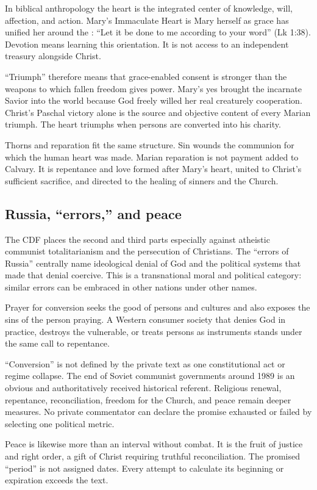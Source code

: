 In biblical anthropology the heart is the integrated center of knowledge, will, affection, and action. Mary's Immaculate Heart is Mary herself as grace has unified her around the : “Let it be done to me according to your word” (Lk 1:38). Devotion means learning this orientation. It is not access to an independent treasury alongside Christ.

“Triumph” therefore means that grace-enabled consent is stronger than the weapons to which fallen freedom gives power. Mary's yes brought the incarnate Savior into the world because God freely willed her real creaturely cooperation. Christ's Paschal victory alone is the source and objective content of every Marian triumph. The heart triumphs when persons are converted into his charity.

Thorns and reparation fit the same structure. Sin wounds the communion for which the human heart was made. Marian reparation is not payment added to Calvary. It is repentance and love formed after Mary's heart, united to Christ's sufficient sacrifice, and directed to the healing of sinners and the Church.

\subsection{Russia, “errors,” and peace}

The CDF places the second and third parts especially against atheistic communist totalitarianism and the persecution of Christians. The “errors of Russia” centrally name ideological denial of God and the political systems that made that denial coercive. This is a transnational moral and political category: similar errors can be embraced in other nations under other names.

Prayer for conversion seeks the good of persons and cultures and also exposes the sins of the person praying. A Western consumer society that denies God in practice, destroys the vulnerable, or treats persons as instruments stands under the same call to repentance.

“Conversion” is not defined by the private text as one constitutional act or regime collapse. The end of Soviet communist governments around 1989 is an obvious and authoritatively received historical referent. Religious renewal, repentance, reconciliation, freedom for the Church, and peace remain deeper measures. No private commentator can declare the promise exhausted or failed by selecting one political metric.

Peace is likewise more than an interval without combat. It is the fruit of justice and right order, a gift of Christ requiring truthful reconciliation. The promised “period” is not assigned dates. Every attempt to calculate its beginning or expiration exceeds the text.

